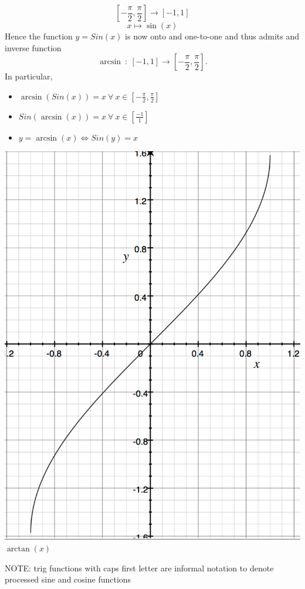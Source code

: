 \documentclass[]{article}
\begin{document}
	$$[-\frac{\pi}{2},\frac{\pi}{2}]\longrightarrow[-1,1]$$
	$$x\mapsto\sin(x)$$
	Hence the function $y=Sin(x)$ is now onto and one-to-one and thus admits and inverse function
	$$
	\arcsin~:~[-1,1]\longrightarrow[-\frac{\pi}{2},\frac{\pi}{2}].
	$$
	In particular,\\
	\begin{itemize}
		\item $\arcsin(Sin(x))=x~\forall~x\in[-\frac{\pi}{2},\frac{\pi}{2}]$
		\item $Sin(\arcsin(x))=x~\forall~x\in[\frac{-1}{1}]$
		\item $y=\arcsin(x)\iff Sin(y)=x$
	\end{itemize}
	\begin{center}
		\includegraphics[scale=0.4]{./graphics/arctanx.png}\\
		$\arctan(x)$
	\end{center}
	NOTE: trig functions with caps first letter are informal notation to denote processed sine and cosine functions
	\pagebreak\\
\end{document}
